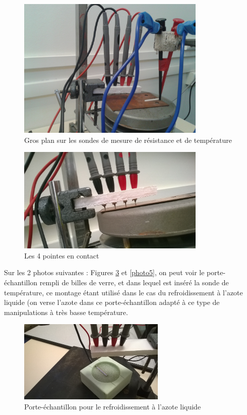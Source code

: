 \newpage

\begin{figure}[!t]
  \begin{center}
		\includegraphics[width=9cm]{./images/photo2.jpg}
		\caption{Gros plan sur les sondes de mesure de résistance et de température}
		\label{photo2}
	\end{center}
\end{figure}
\begin{figure}[h]
  \begin{center}
		\includegraphics[width=9cm]{./images/photo3.jpg}
		\caption{Les 4 pointes en contact}
		\label{photo3}
	\end{center}
\end{figure}

Sur les 2 photos suivantes : Figures \ref{photo4} et \ref{photo5}, on peut voir le porte-échantillon rempli de billes de verre, et dans lequel est inséré la sonde de température, ce montage étant utilisé dans le cas du refroidissement à l'azote liquide (on verse l'azote dans ce porte-échantillon adapté à ce type de manipulations à très basse température.

\newpage

\begin{figure}[!t]
  \begin{center}
		\includegraphics[width=7cm]{./images/photo4.jpg}
		\caption{Porte-échantillon pour le refroidissement à l'azote liquide}
		\label{photo4}
	\end{center}
\end{figure}

